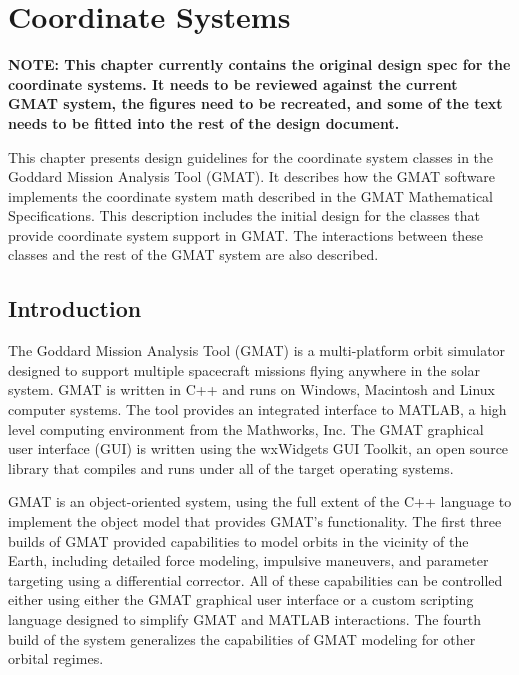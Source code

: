 \chapter{\label{chapter:CoordinateSystems}Coordinate Systems}

\textbf{NOTE: This chapter currently contains the original design spec for the coordinate systems.
It needs to be reviewed against the current GMAT system, the figures need to be recreated, and some
of the text needs to be fitted into the rest of the design document.}

This chapter presents design guidelines for the coordinate system classes in the Goddard Mission
Analysis Tool (GMAT). It describes how the GMAT software implements the coordinate system math
described in the GMAT Mathematical Specifications\cite{mathSpec}. This description includes the
initial design for the classes that provide coordinate system support in GMAT. The interactions
between these classes and the rest of the GMAT system are also described.

\section{Introduction}

The Goddard Mission Analysis Tool (GMAT) is a multi-platform orbit simulator designed to support
multiple spacecraft missions flying anywhere in the solar system. GMAT is written in C++ and runs on
Windows, Macintosh and Linux computer systems. The tool provides an integrated interface to MATLAB,
a high level computing environment from the Mathworks, Inc\cite{MATLAB}. The GMAT graphical user
interface (GUI) is written using the wxWidgets GUI Toolkit\cite{wxWidgets}, an open source library
that compiles and runs under all of the target operating systems.

GMAT is an object-oriented system, using the full extent of the C++ language to implement the object
model that provides GMAT's functionality.  The first three builds of GMAT provided capabilities to
model orbits in the vicinity of the Earth, including detailed force modeling, impulsive
maneuvers, and parameter targeting using a differential corrector.  All of these capabilities can be
controlled either using either the GMAT graphical user interface or a custom scripting language
designed to simplify GMAT and MATLAB interactions. The fourth build of the system generalizes the
capabilities of GMAT modeling for other orbital regimes.

